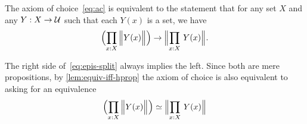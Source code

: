 \documentclass[hott-all.tex]{subfiles}
\begin{document}
\begin{lem}
  The axiom of choice~\eqref{eq:ac} is equivalent to the statement that for any set $X$ and any $Y:X\to\mathcal{U}$ such that each $Y(x)$ is a set, we have
  \begin{equation}
    \Parens{\prd{x:X} \Brck{Y(x)}}
    \to
    \Brck{\prd{x:X} Y(x)}.\fakelabel{eq:epis-split}
  \end{equation}
\end{lem}
%
%
%
%
\begin{rmk}
  The right side of~\eqref{eq:epis-split} always implies the left.
  Since both are mere propositions, by \cref{lem:equiv-iff-hprop} the axiom of choice is also equivalent to asking for an equivalence
  \[ \eqv{\Parens{\prd{x:X} \Brck{Y(x)}}}{\Brck{\prd{x:X} Y(x)}} \]
\end{rmk}
%
\end{document}
